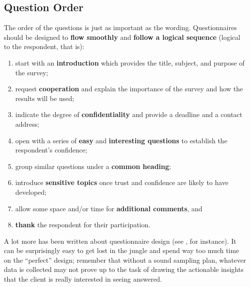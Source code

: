 \subsection{Question Order} The order of the questions is just as important as the wording. Questionnaires should be designed to \textbf{flow smoothly} and \textbf{follow a logical sequence} (logical to the respondent, that is):  
\begin{enumerate}[noitemsep]
\item start with an \textbf{introduction} which provides the title, subject, and purpose of the survey;
\item request \textbf{cooperation} and explain the importance of the survey and how the results will be used;
\item indicate the degree of \textbf{confidentiality} and provide a deadline and a contact address;
\item open with a series of \textbf{easy} and \textbf{interesting questions} to establish the respondent's confidence;
\item group similar questions under a \textbf{common heading};
\item introduce \textbf{sensitive topics} once trust and confidence are likely to have developed;
\item allow some space and/or time for \textbf{additional comments}, and 
\item \textbf{thank} the respondent for their participation.
\end{enumerate}
A lot more has been written about questionnaire design (see \cite{DC_O}, for instance). It can be surprisingly easy to get lost in the jungle and spend way too much time on the ``perfect'' design; remember that without a sound sampling plan, whatever data is collected may not prove up to the task of drawing the actionable insights that the client is really interested in seeing  answered. 